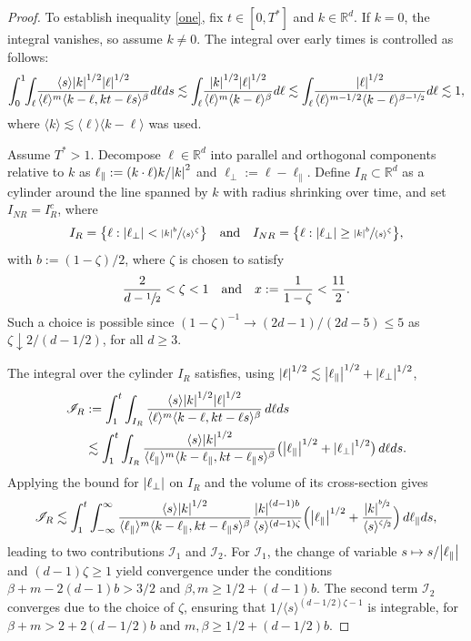\documentclass[JEP,XML,SOM,Unicode]{cedram}
\newcommand{\shalf}{\sfrac{1}{2}}
\theoremstyle{plain}
\theoremstyle{remark}
\newcommand{\bbr}[1]{\bigl(#1 \bigr)}
\newcommand{\Bbr}[1]{\Bigl(#1 \Bigr)}
\newcommand{\ak}{\abs{k}}
\newcommand{\jb}[1]{\langle#1\rangle}
\newcommand{\bset}[1]{\bigl\{#1\bigr\}}
\newcommand{\qaq}{\quad\text{and}\quad}
\newcommand{\para}{\parallel}
\newcommand{\R}{\mathbb{R}}
\begin{document}
\begin{proof}
To establish inequality \eqref{one}, fix $t\in[0,T^*]$ and $k\in\R^d$. If $k=0$, the integral vanishes, so assume $k\neq0$. The integral over early times is controlled as follows:
\begin{align*}
\int_0^1\hspace{-1mm}\int_\ell\!\frac{\jb{ s }\ak^{1/2}\abs{\ell}^{1/2}}{\jb{\ell}^m\jb{k-\ell,kt-\ell s }^{\beta}}d\ell d s \lesssim\int_\ell\!\frac{\ak^{1/2}\abs{\ell}^{1/2}}{\jb{\ell}^m\jb{k-\ell}^{\beta}}d\ell\lesssim\int_\ell\!\frac{\abs{\ell}^{1/2}}{\jb{\ell}^{m-{1/2}}\jb{k-\ell}^{\beta-\shalf}}d\ell\lesssim1,
\end{align*}where $\jb{k}\lesssim\jb{\ell}\jb{k-\ell}$ was used.

Assume $T^*>1$. Decompose $\ell\in\R^d$ into parallel and orthogonal components relative to $k$ as $\ell_\para:=(k\cdot\ell)k/\ak^2$ and $\ell_\perp:=\ell-\ell_\para$. Define $I_R\subset\R^d$ as a cylinder around the line spanned by $k$ with radius shrinking over time, and set $I_{NR}=I_R^c$, where
\begin{align*}
I_R=\bset{\ell:\abs{\ell_\perp}<\sfrac{\ak^b}{\jb{ s }^\zeta}}\qaq I_{NR}=\bset{\ell:\abs{\ell_\perp}\geq\sfrac{\ak^b}{\jb{ s }^\zeta}},
\end{align*}with $b:=(1-\zeta)/2$, where $\zeta$ is chosen to satisfy
\begin{align*}
\frac{2}{d-\sfrac{1}{2}}<\zeta<1\qaq x:=\frac{1}{1-\zeta}<\frac{11}{2}.
\end{align*}
Such a choice is possible since $(1-\zeta)^{-1}\to(2d-1)/(2d-5)\leq5$ as $\zeta\downarrow2/(d-1/2)$, for all $d\geq3$.

The integral over the cylinder $I_R$ satisfies, using $\abs{\ell}^{1/2}\lesssim\abs{\ell_\para}^{1/2}+\abs{\ell_\perp}^{1/2}$,
\begin{align*}
\mathscr{I}_R&:=\int_1^t\int_{I_R}\frac{\jb{ s }\ak^{1/2}\abs{\ell}^{1/2}}{\jb{\ell}^m\jb{k-\ell,kt-\ell s}^{\beta}}\,d\ell d s\\
&\lesssim\int_1^t\int_{I_R}\frac{\jb{ s }\ak^{1/2}}{\jb{\ell_\para}^m\jb{k-\ell_\para,kt-\ell_\para s }^\beta}\bbr{\abs{\ell_\para}^{1/2}+\abs{\ell_\perp}^{1/2}}\,d\ell d s.
\end{align*}
Applying the bound for $\abs{\ell_\perp}$ on $I_R$ and the volume of its cross-section gives
\begin{align*}
\mathscr I_R\lesssim\int_1^t\int_{-\infty}^\infty\frac{\jb{ s }\ak^{1/2}}{\jb{\ell_\para}^m\jb{k-\ell_\para,kt-\ell_\para s }^\beta}\frac{\ak^{(d-1)b}}{\jb{ s }^{(d-1)\zeta}}\Bbr{\abs{\ell_\para}^{1/2}+\frac{\ak^{\sfrac{b}{2}}}{\jb{ s }^{\sfrac{\zeta}{2}}}}\,d\ell_\para d s,
\end{align*}
leading to two contributions $\mathscr I_1$ and $\mathscr I_2$. For $\mathscr I_1$, the change of variable $ s \mapsto s /\abs{\ell_\para}$ and $(d-1)\zeta\geq1$ yield convergence under the conditions $\beta+m-2(d-1)b>3/2$ and $\beta,m\geq1/2+(d-1)b$. The second term $\mathscr I_2$ converges due to the choice of $\zeta$, ensuring that $1/\jb{ s }^{(d-1/2)\zeta-1}$ is integrable, for $\beta+m>2+2(d-1/2)b$ and $m,\beta\geq 1/2+(d-1/2)b$.


\end{proof}
\end{document}
